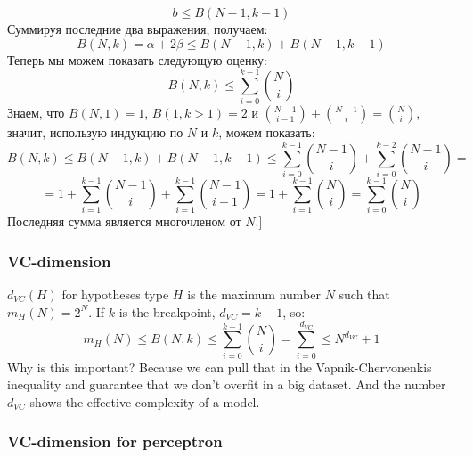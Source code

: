 $$b\le B(N-1,k-1)$$
Суммируя последние два выражения, получаем:
$$B(N,k)=\alpha+2\beta\le B(N-1, k)+B(N-1,k-1)$$
Теперь мы можем показать следующую оценку:
$$B(N,k)\le\sum\limits_{i=0}^{k-1}\binom{N}{i}$$
Знаем, что $B(N,1)=1$, $B(1,k>1)=2$ и $\binom{N-1}{i-1}+\binom{N-1}{i}=\binom{N}{i}$, значит, использую индукцию по $N$ и $k$, можем показать:
$$B(N,k)\le B(N-1,k)+B(N-1,k-1)\le\sum\limits_{i=0}^{k-1}\binom{N-1}{i}+\sum\limits_{i=0}^{k-2}\binom{N-1}{i}=$$ $$=1+\sum\limits_{i=1}^{k-1}\binom{N-1}{i}+\sum\limits_{i=1}^{k-1}\binom{N-1}{i-1}=1+\sum\limits_{i=1}^{k-1}\binom{N}{i}=\sum\limits_{i=0}^{k-1}\binom{N}{i}$$
Последняя сумма является многочленом от $N$.]

\subsubsection*{VC-dimension}

$d_{VC}(H)$ for hypotheses type $H$ is the maximum number $N$ such that $m_H(N)=2^N$. If $k$ is the breakpoint, $d_{VC}=k-1$, so:
$$m_H(N)\le B(N,k)\le\sum\limits_{i=0}^{k-1}\binom{N}{i}=\sum\limits_{i=0}^{d_{VC}}\le N^{d_{VC}}+1$$
Why is this important? Because we can pull that in the Vapnik-Chervonenkis inequality and guarantee that we don't overfit in a big dataset. And the number $d_{VC}$ shows the effective complexity of a model.

\subsubsection*{VC-dimension for perceptron}

